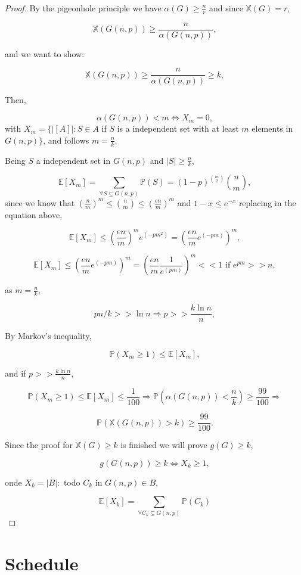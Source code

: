 \documentclass[12pt,twoside,a4paper]{book}
\numberwithin{equation}{section}
\let\subset\subseteq
\let\log=\ln
\theoremstyle{remark}
\begin{document}
\begin{proof}
By the pigeonhole principle we have $\alpha (G) \geq \frac{n}{r}$ and since $\mathbb{X}(G)=r$,

$$\mathbb{X}(G(n,p)) \geq \frac{n}{\alpha(G(n,p))},$$

and we want to show:

$$\mathbb{X}(G(n,p)) \geq \frac{n}{\alpha(G(n,p))} \geq k ,$$

Then,

$$\alpha(G(n,p)) < m \iff X_m=0 ,$$
with $X_m = \{|[A]|: S \in A$ if $S$ is a independent set with at least $m$ elements in $G(n,p)\}$,
and follows $m = \frac{n}{k}$. 

Being $S$ a independent set in $G(n,p)$ and $|S| \geq \frac{n}{k}$,

$$\mathbb{E}[X_m]=\sum_{\forall S\subset G(n,p)} \mathbb{P}(S) =(1-p)^{\binom{m}{2}} \binom{n}{m},$$
since we know that $\left(\frac{n}{m}\right)^m \leq \binom{n}{m} \leq \left(\frac{en}{m}\right)^m$ and $1-x \leq e^{-x}$ replacing in the equation above,

$$\mathbb{E}[X_m] \leq \left(\frac{en}{m}\right)^m  e^{(-pm^2)} = \left(\frac{en}{m} e^{(-pm)}\right)^m,$$

$$\mathbb{E}[X_m] \leq \left(\frac{en}{m} e^{(-pm)}\right)^m = \left(\frac{en}{m}\frac{1}{e^{(pm)}}\right)^m  << 1 \text{ if } e^{pm} >> n ,$$ 

as $m =\frac{n}{k}$,

$$ pn/k >> \log n \Rightarrow p >> \frac{k\log n}{n},$$
 
 By Markov's inequality,
 
 $$ \mathbb{P}(X_m \geq 1) \leq \mathbb{E}[X_m] ,$$
 
and if $p >> \frac{k \log n}{n},$
 
 $$ \mathbb{P}(X_m \geq 1) \leq \mathbb{E}[X_m] \leq \frac{1}{100}  \Rightarrow \mathbb{P}(\alpha (G(n,p)) < \frac{n}{k}) \geq \frac{99}{100} \Rightarrow $$

$$\mathbb{P}(\mathbb{X}(G(n,p)) > k) \geq \frac{99}{100}.$$


Since the proof for $\mathbb{X}(G) \geq k$ is finished we will prove $g(G)\geq k$,

$$ g(G(n,p)) \geq k \iff X_k \geq 1,$$


onde $X_k = |B|: $ todo $ C_k$ in $G(n,p) \in B$,

$$\mathbb{E}[X_k] = \sum_{\forall C_k \subset G(n,p)} \mathbb{P}(C_k)$$
\end{proof}

\chapter{Schedule}
\end{document}
